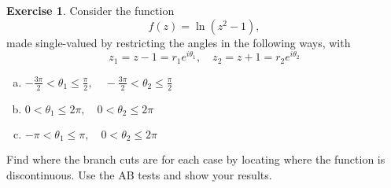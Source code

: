 \documentclass[12pt]{article}
\theoremstyle{definition}
\newtheorem{exer}{Exercise}
\theoremstyle{remark}
\begin{document}
\newpage

\begin{exer}
Consider the function
\begin{equation*}
    f(z) = \ln(z^2 -1),
\end{equation*}
made single-valued by restricting the angles in the following ways, with 
\begin{equation*}
    z_1 = z - 1 = r_{1} e^{i\theta_{1}}, \quad z_2 = z +1 = r_{2} e^{i\theta_{2}}
\end{equation*}

\begin{enumerate}[(a)]
    \item $-\frac{3\pi}{2}< \theta_{1}\leq \frac{\pi}{2}, \quad -\frac{3\pi}{2}<\theta_{2}\leq \frac{\pi}{2}$
    \item $0< \theta_{1}\leq 2\pi, \quad 0< \theta_{2}\leq 2\pi$
    \item $-\pi < \theta_{1} \leq \pi,\quad 0<\theta_{2} \leq 2\pi$
\end{enumerate}

Find where the branch cuts are for each case by locating where the function is discontinuous. Use the AB tests and show your results.
\end{exer}
\end{document}
